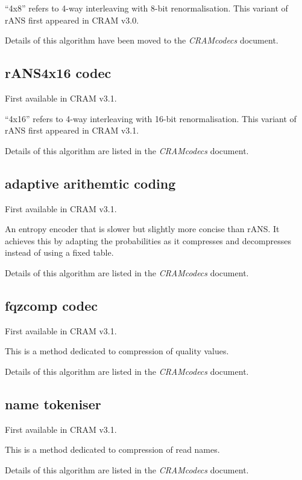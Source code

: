 \documentclass[a4paper]{article}
\begin{document}
``4x8'' refers to 4-way interleaving with 8-bit renormalisation.\newline
This variant of rANS first appeared in CRAM v3.0.

Details of this algorithm have been moved to the \textit{CRAMcodecs} document.

\subsection{\textbf{rANS4x16 codec}}

First available in CRAM v3.1.

``4x16'' refers to 4-way interleaving with 16-bit renormalisation.\newline
This variant of rANS first appeared in CRAM v3.1.

Details of this algorithm are listed in the \textit{CRAMcodecs} document.

\subsection{\textbf{adaptive arithemtic coding}}

First available in CRAM v3.1.

An entropy encoder that is slower but slightly more concise than
rANS.  It achieves this by adapting the probabilities as it compresses
and decompresses instead of using a fixed table.

Details of this algorithm are listed in the \textit{CRAMcodecs} document.

\subsection{\textbf{fqzcomp codec}}

First available in CRAM v3.1.

This is a method dedicated to compression of quality values.

Details of this algorithm are listed in the \textit{CRAMcodecs} document.

\subsection{\textbf{name tokeniser}}

First available in CRAM v3.1.

This is a method dedicated to compression of read names.

Details of this algorithm are listed in the \textit{CRAMcodecs} document.
\end{document}
